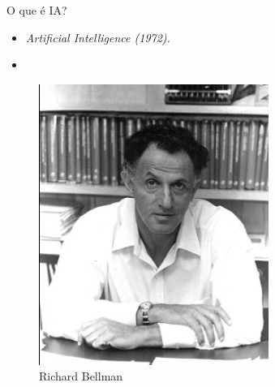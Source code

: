 \begin{frame}{O que é IA?}
    \begin{minipage}{0.5\linewidth}
        \begin{itemize}
        \justifying
            \item \textit{Artificial Intelligence (1972).}
            \item 
        \end{itemize}
    \end{minipage}
    \begin{minipage}{0.5\linewidth}
        \begin{figure}
            \centering
            \includegraphics[width=0.6\linewidth]{imagens//secao1/bellman1978.png}
            \caption{Richard Bellman}
            \label{fig:enter-label}
        \end{figure}
    \end{minipage}
\end{frame}

